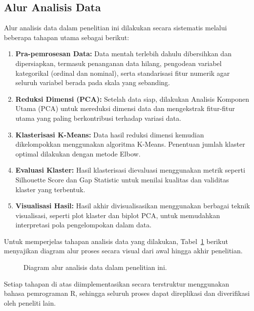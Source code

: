 \subsection{Alur Analisis Data}

Alur analisis data dalam penelitian ini dilakukan secara sistematis melalui beberapa tahapan utama sebagai berikut:

\begin{enumerate}
	\item \textbf{Pra-pemrosesan Data:} Data mentah terlebih dahulu dibersihkan dan dipersiapkan, termasuk penanganan data hilang, pengodean variabel kategorikal (ordinal dan nominal), serta standarisasi fitur numerik agar seluruh variabel berada pada skala yang sebanding.
	\item \textbf{Reduksi Dimensi (PCA):} Setelah data siap, dilakukan Analisis Komponen Utama (PCA) untuk mereduksi dimensi data dan mengekstrak fitur-fitur utama yang paling berkontribusi terhadap variasi data.
	\item \textbf{Klasterisasi K-Means:} Data hasil reduksi dimensi kemudian dikelompokkan menggunakan algoritma K-Means. Penentuan jumlah klaster optimal dilakukan dengan metode Elbow.
	\item \textbf{Evaluasi Klaster:} Hasil klasterisasi dievaluasi menggunakan metrik seperti Silhouette Score dan Gap Statistic untuk menilai kualitas dan validitas klaster yang terbentuk.
	\item \textbf{Visualisasi Hasil:} Hasil akhir divisualisasikan menggunakan berbagai teknik visualisasi, seperti plot klaster dan biplot PCA, untuk memudahkan interpretasi pola pengelompokan dalam data.
\end{enumerate}

Untuk memperjelas tahapan analisis data yang dilakukan, Tabel~\ref{fig:alur} berikut menyajikan diagram alur proses secara visual dari awal hingga akhir penelitian.

\begin{figure}[h]
	\centering
	\resizebox{0.4\linewidth}{!}{}
	\caption{Diagram alur analisis data dalam penelitian ini.}\label{fig:alur}
\end{figure}

Setiap tahapan di atas diimplementasikan secara terstruktur menggunakan bahasa pemrograman R, sehingga seluruh proses dapat direplikasi dan diverifikasi oleh peneliti lain.

